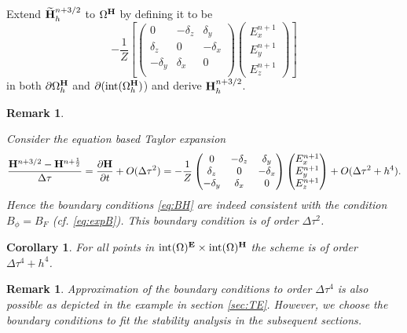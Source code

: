 \documentclass[12pt,reqno]{amsart}
\newcommand{\e}{{\bf E}}
\newcommand{\h}{{\bf H}}
\newtheorem{cor}[theorem]{Corollary}
\newtheorem{rem}[theorem]{Remark}
\theoremstyle{definition}
\numberwithin{equation}{section}
\newcommand{\intr}[1]{\mathrm{int}(#1)}
\def\Gw{\Omega}     \def\Gx{\Xi}         \def\Gy{\Psi}
\def\Gwh{\Omega_h}
\begin{document}
		Extend $\widetilde{\h}_h^{n+3/2}$
	to $\Gw^\h$ by defining it to be 
	$$
		-\frac{1}{Z}
	\left[ 
	\begin{pmatrix}
		0& -\delta_z & \delta _y\\
		\delta_z&0&-\delta_x\\
		-\delta_y&\delta_x&0\\
	\end{pmatrix}
	\begin{pmatrix}
		E_x^{n+1}\\
		E_y^{n+1}\\
		E_z^{n+1}
	\end{pmatrix}\right]
	$$
	in both $\partial \Gwh^\h$ and $\partial (\intr{\Gwh^{\h}}$)
	and derive $\h_h^{n+3/2}$.
	
	
\begin{rem}\label{rem:expB}


Consider the equation based  Taylor expansion
	$$
	\frac{\h^{n+3/2}-\h^{n+\frac{1}{2} } }{\Delta \tau}=
	\frac{\partial \h}{\partial t}+O(\Delta \tau ^2)=
	-\frac{1}{Z}	\begin{pmatrix}
		0& -\delta_z & \delta _y\\
		\delta_z&0&-\delta_x\\
		-\delta_y&\delta_x&0\\
	\end{pmatrix}
	\begin{pmatrix}
		E_x^{n+1}\\
		E_y^{n+1}\\
		E_z^{n+1}
	\end{pmatrix}+O(\Delta \tau^2+h^4).
	$$
	Hence the  boundary conditions \eqref{eq:BH} are 
 indeed consistent with the condition 
	$B_\phi=B_F$ (cf. \eqref{eq:expB}).
 This boundary condition is of order $\Delta \tau^2$.
\end{rem}
	\begin{cor}
		For all points in $\intr \Gw^{\e}\times\intr\Gw^\h$ the scheme is of order $\Delta \tau^4+h^4$.
	\end{cor}
   
	\begin{rem}
	Approximation of the boundary conditions to order $\Delta \tau ^4$ is also possible as depicted in the example in section \ref{sec:TE}. However, we choose the boundary conditions to fit the stability analysis in the subsequent sections.
	\end{rem}
\end{document}
